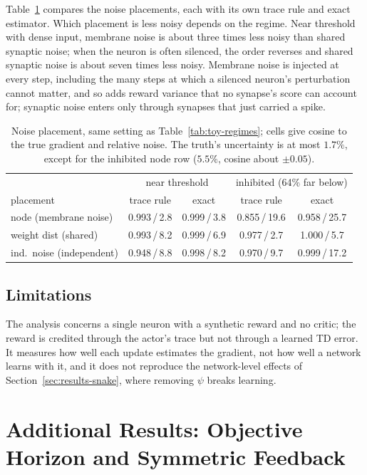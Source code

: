 \documentclass[10pt,twocolumn]{article}
\begin{document}
Table~\ref{tab:toy-placement} compares the noise placements, each with its own
trace rule and exact estimator. Which placement is less noisy depends on the
regime. Near threshold with dense input, membrane noise is about three times
less noisy than shared synaptic noise; when the neuron is often silenced, the
order reverses and shared synaptic noise is about seven times less noisy.
Membrane noise is injected at every step, including the many steps at which a
silenced neuron's perturbation cannot matter, and so adds reward variance that
no synapse's score can account for; synaptic noise enters only through
synapses that just carried a spike.

\begin{table}[h]
\centering\footnotesize
\begin{tabular}{@{}lcccc@{}}
\toprule
& \multicolumn{2}{c}{near threshold} & \multicolumn{2}{c}{inhibited (64\% far below)} \\
placement & trace rule & exact & trace rule & exact \\
\midrule
node (membrane noise)      & 0.993\,/\,2.8 & 0.999\,/\,3.8 & 0.855\,/\,19.6 & 0.958\,/\,25.7 \\
weight dist (shared)       & 0.993\,/\,8.2 & 0.999\,/\,6.9 & 0.977\,/\,2.7 & 1.000\,/\,5.7 \\
ind.\ noise (independent)  & 0.948\,/\,8.8 & 0.998\,/\,8.2 & 0.970\,/\,9.7 & 0.999\,/\,17.2 \\
\bottomrule
\end{tabular}
\caption{Noise placement, same setting as Table~\ref{tab:toy-regimes}; cells
give cosine to the true gradient and relative noise. The truth's uncertainty is
at most $1.7\%$, except for the inhibited node row ($5.5\%$, cosine about
$\pm0.05$).}
\label{tab:toy-placement}
\end{table}

\subsection{Limitations}
\label{app:trace-limits}

The analysis concerns a single neuron with a synthetic reward and no critic;
the reward is credited through the actor's trace but not through a learned TD
error. It measures how well each update estimates the gradient, not how well a
network learns with it, and it does not reproduce the network-level effects of
Section~\ref{sec:results-snake}, where removing $\psi$ breaks learning.


\section{Additional Results: Objective Horizon and Symmetric Feedback}
\label{app:extra-results}
\end{document}
